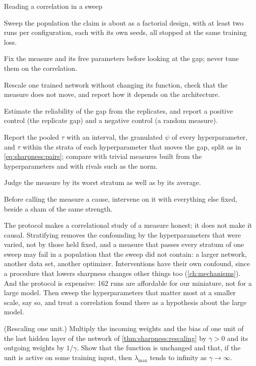 \begin{refsection}
\begin{protocol}{Reading a correlation in a sweep}\label{prot:sharpness:sweep}
\item Sweep the population the claim is about as a factorial design, with at least two runs per configuration, each with its own seeds, all stopped at the same training loss.
\item Fix the measure and its free parameters before looking at the gap; never tune them on the correlation.
\item Rescale one trained network without changing its function, check that the measure does not move, and report how it depends on the architecture.
\item Estimate the reliability of the gap from the replicates, and report a positive control (the replicate gap) and a negative control (a random measure).
\item Report the pooled $\tau$ with an interval, the granulated $\psi$ of every hyperparameter, and $\tau$ within the strata of each hyperparameter that moves the gap, split as in \eqref{eq:sharpness:pairs}; compare with trivial measures built from the hyperparameters and with rivals such as the norm.
\item Judge the measure by its worst stratum as well as by its average.
\item Before calling the measure a cause, intervene on it with everything else fixed, beside a sham of the same strength.
\end{protocol}

The protocol makes a correlational study of a measure honest; it does not make it causal. Stratifying removes the confounding by the hyperparameters that were varied, not by those held fixed, and a measure that passes every stratum of one sweep may fail in a population that the sweep did not contain: a larger network, another data set, another optimizer. Interventions have their own confound, since a procedure that lowers sharpness changes other things too (\cref{ch:mechanisms}). And the protocol is expensive: 162 runs are affordable for our miniature, not for a large model. Then sweep the hyperparameters that matter most at a smaller scale, say so, and treat a correlation found there as a hypothesis about the large model.

\begin{exercises}
\item \consolidation (Rescaling one unit.) Multiply the incoming weights and the bias of one unit of the last hidden layer of the network of \cref{thm:sharpness:rescaling} by $\gamma>0$ and its outgoing weights by $1/\gamma$. Show that the function is unchanged and that, if the unit is active on some training input, then $\lambda_{\max}$ tends to infinity as $\gamma\to\infty$. \label{ex:sharpness:unit}


\end{exercises}
\end{refsection}
